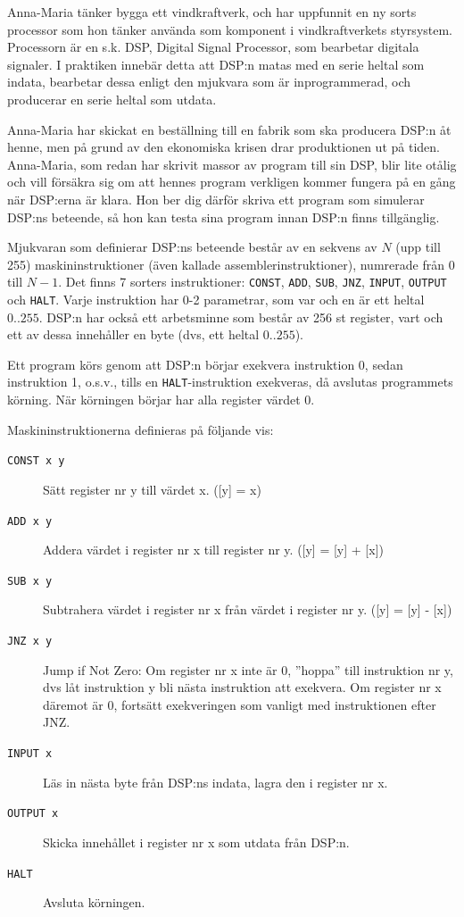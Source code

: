 
Anna-Maria tänker bygga ett vindkraftverk, och har uppfunnit en ny sorts processor som hon tänker använda som komponent i vindkraftverkets styrsystem. Processorn är en s.k. DSP, Digital Signal Processor, som bearbetar digitala signaler. I praktiken innebär detta att DSP:n matas med en serie heltal som indata, bearbetar dessa enligt den mjukvara som är inprogrammerad, och producerar en serie heltal som utdata.

Anna-Maria har skickat en beställning till en fabrik som ska producera DSP:n åt henne, men på grund av den ekonomiska krisen drar produktionen ut på tiden. Anna-Maria, som redan har skrivit massor av program till sin DSP, blir lite otålig och vill försäkra sig om att hennes program verkligen kommer fungera på en gång när DSP:erna är klara. Hon ber dig därför skriva ett program som simulerar DSP:ns beteende, så hon kan testa sina program innan DSP:n finns tillgänglig.

Mjukvaran som definierar DSP:ns beteende består av en sekvens av $N$ (upp till 255) maskininstruktioner (även kallade assemblerinstruktioner), numrerade från $0$ till $N-1$. Det finns 7 sorters instruktioner: \texttt{CONST}, \texttt{ADD}, \texttt{SUB}, \texttt{JNZ}, \texttt{INPUT}, \texttt{OUTPUT} och \texttt{HALT}. Varje instruktion har 0-2 parametrar, som var och en är ett heltal $0..255$. DSP:n har också ett arbetsminne som består av 256 st register, vart och ett av dessa innehåller en byte (dvs, ett heltal $0..255$).

Ett program körs genom att DSP:n börjar exekvera instruktion 0, sedan instruktion 1, o.s.v., tills en \texttt{HALT}-instruktion exekveras, då avslutas programmets körning. När körningen börjar har alla register värdet 0. 

Maskininstruktionerna definieras på följande vis: 

\begin{description}
\item[\texttt{CONST x y}] Sätt register nr y till värdet x. ([y] = x)
\item[\texttt{ADD x y}] Addera värdet i register nr x till register nr y. ([y] = [y] + [x])
\item[\texttt{SUB x y}] Subtrahera värdet i register nr x från värdet i register nr y. ([y] = [y] - [x])
\item[\texttt{JNZ x y}] Jump if Not Zero: Om register nr x inte är 0, ''hoppa'' till instruktion nr y, dvs låt instruktion y bli nästa instruktion att exekvera. Om register nr x däremot är 0, fortsätt exekveringen som vanligt med instruktionen efter JNZ.
\item[\texttt{INPUT x}] Läs in nästa byte från DSP:ns indata, lagra den i register nr x.
\item[\texttt{OUTPUT x}] Skicka innehållet i register nr x som utdata från DSP:n.
\item[\texttt{HALT}] Avsluta körningen.
\end{description}

